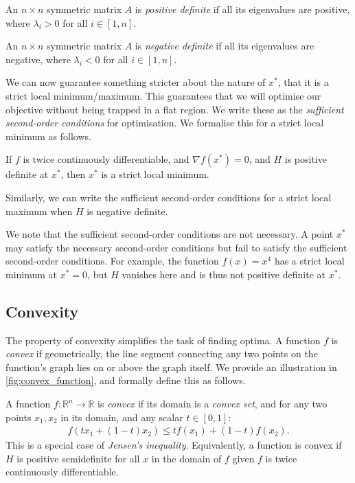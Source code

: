\begin{definition}
    An $n \times n$ symmetric matrix $A$ is \textit{positive definite} if all its eigenvalues are positive, where $\lambda_i > 0$ for all $i \in [1, n]$.
\end{definition}
\begin{definition}
    An $n \times n$ symmetric matrix $A$ is \textit{negative definite} if all its eigenvalues are negative, where $\lambda_i < 0$ for all $i \in [1, n]$.
\end{definition}

We can now guarantee something stricter about the nature of $x^*$, that it is a strict local minimum/maximum. This guarantees that we will optimise our objective without being trapped in a flat region. We write these as the \textit{sufficient second-order conditions} for optimisation. We formalise this for a strict local minimum as follows.
\begin{definition}
    If $f$ is twice continuously differentiable, and $\nabla f(x^*) = 0$, and $H$ is positive definite at $x^*$, then $x^*$ is a strict local minimum.
\end{definition}
Similarly, we can write the sufficient second-order conditions for a strict local maximum when $H$ is negative definite.

We note that the sufficient second-order conditions are not necessary. A point $x^*$ may satisfy the necessary second-order conditions but fail to satisfy the sufficient second-order conditions. For example, the function $f(x) = x^4$ has a strict local minimum at $x^* = 0$, but $H$ vanishes here and is thus not positive definite at $x^*$. 

\subsection{Convexity}
\label{ssec:convexity}

The property of convexity simplifies the task of finding optima. A function $f$ is \textit{convex} if geometrically, the line segment connecting any two points on the function's graph lies on or above the graph itself. We provide an illustration in \cref{fig:convex_function}, and formally define this as follows.
\begin{definition}
    A function $f: \mathbb{R}^n \to \mathbb{R}$ is \textit{convex} if its domain is a \textit{convex set}, and for any two points $x_1, x_2$ in its domain, and any scalar $t \in [0, 1]$:
    \begin{align}
        f(t x_1 + (1-t)x_2) \leq t f(x_1) + (1-t)f(x_2).
    \end{align}
    This is a special case of \textit{Jensen's inequality}. Equivalently, a function is convex if $H$ is positive semidefinite for all $x$ in the domain of $f$ given $f$ is twice continuously differentiable.
\end{definition}

